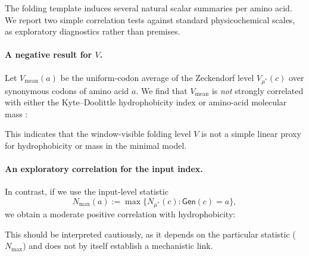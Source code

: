 The folding template induces several natural scalar summaries per amino acid.
We report two simple correlation tests against standard physicochemical scales, as exploratory diagnostics rather than premises.

\paragraph{A negative result for $V$.}
Let $V_\mathrm{mean}(a)$ be the uniform-codon average of the Zeckendorf level $V_{\mu^\ast}(c)$ over synonymous codons of amino acid $a$.
We find that $V_\mathrm{mean}$ is \emph{not} strongly correlated with either the Kyte--Doolittle hydrophobicity index \cite{KyteDoolittle1982} or amino-acid molecular mass \cite{NelsonCox2017}:

This indicates that the window-visible folding level $V$ is not a simple linear proxy for hydrophobicity or mass in the minimal model.

\paragraph{An exploratory correlation for the input index.}
In contrast, if we use the input-level statistic
\[
N_{\max}(a):=\max\{N_{\mu^\ast}(c): \mathsf{Gen}(c)=a\},
\]
we obtain a moderate positive correlation with hydrophobicity:

This should be interpreted cautiously, as it depends on the particular statistic ($N_{\max}$) and does not by itself establish a mechanistic link.


